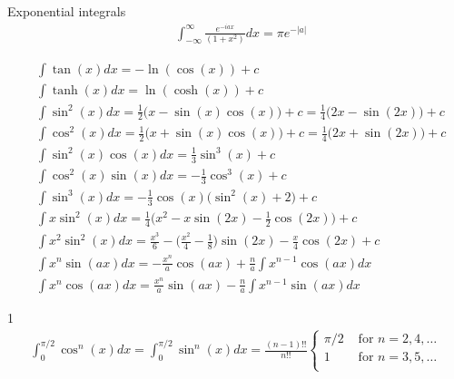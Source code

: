 Exponential integrals
\begin{align}
	&\int_{-\infty}^{\infty} \frac{e^{-iax}}{(1+x^2)}dx = \pi e^{-|a|}
\end{align}
\begin{fancybox}{1}
\begin{align}
	&\int \tan(x)dx = -\ln(\cos(x)) +c\\
	&\int \tanh(x)dx = \ln(\cosh(x))+c \\
	&\int \sin^2(x)dx = \frac{1}{2}\big(x-\sin(x)\cos(x)\big)+c = \frac{1}{4}\big(2x-\sin(2x)\big)+c\\
	&\int \cos^2(x)dx = \frac{1}{2}\big(x+\sin(x)\cos(x)\big)+c = \frac{1}{4}\big(2x+\sin(2x)\big)+c \\
	&\int \sin^2(x)\cos(x)dx = \frac{1}{3}\sin^3(x)+c \\
	&\int \cos^2(x)\sin(x)dx = -\frac{1}{3}\cos^3(x)+c \\
	&\int \sin^3(x)dx = -\frac{1}{3}\cos(x)\big(\sin^2(x)+2\big)+c \\
	&\int x\sin^2(x)dx = \frac{1}{4}\big(x^2-x\sin(2x)-\frac{1}{2}\cos(2x)\big)+c\\
	&\int x^2\sin^2(x)dx =\frac{x^3}{6}-\bigg(\frac{x^2}{4}-\frac{1}{8}\bigg)\sin(2x)-\frac{x}{4}\cos(2x)+c \\
	&\int x^n \sin(ax)dx = -\frac{x^n}{a}\cos(ax)+ \frac{n}{a}\int x^{n-1}\cos(ax)dx \\
	&\int x^n \cos(ax)dx = \frac{x^n}{a}\sin(ax)- \frac{n}{a}\int x^{n-1}\sin(ax)dx		
\end{align}
\end{fancybox}

\begin{defn}{1}
\begin{align}
\int_{0}^{\pi/2}\cos^n(x) dx = \int_{0}^{\pi/2}\sin^n(x) dx = \frac{(n-1)!!}{n!!}
\begin{cases}
\pi/2 &\textrm{ for } n=2,4,\dots\\
1 &\textrm{ for } n=3,5,\dots\\
\end{cases}
\end{align}
\end{defn}




\newpage
